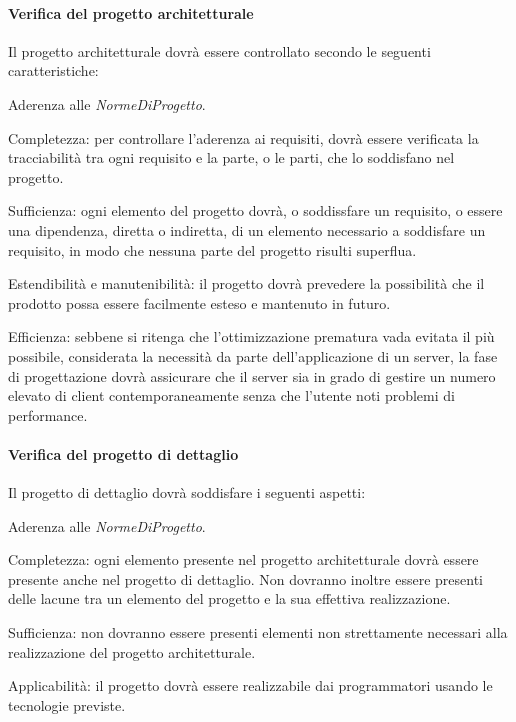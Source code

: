 \paragraph{Verifica del progetto architetturale}
Il progetto architetturale dovr\`a essere controllato secondo le seguenti caratteristiche:
\begin{elenconumerato}[\textbf{}]{\subsubsecindent}
\item Aderenza alle \textit{NormeDiProgetto}.
\item Completezza: per controllare l'aderenza ai requisiti, dovr\`a essere verificata la tracciabilit\`a tra ogni requisito e la parte, o le parti, che lo soddisfano nel progetto.
\item Sufficienza: ogni elemento del progetto dovr\`a, o soddissfare un requisito, o essere una dipendenza, diretta o indiretta, di un elemento necessario a soddisfare un requisito, in modo che nessuna parte del progetto risulti superflua.
\item Estendibilit\`a e manutenibilit\`a: il progetto dovr\`a prevedere la possibilit\`a che il prodotto possa essere facilmente esteso e mantenuto in futuro.
\item Efficienza: sebbene si ritenga che l'ottimizzazione prematura vada evitata il pi\`u possibile, considerata la necessit\`a da parte dell'applicazione di un server, la fase di progettazione dovr\`a assicurare che il server sia in grado di gestire un numero elevato di client contemporaneamente senza che l'utente noti problemi di performance.
\end{elenconumerato}
\paragraph{Verifica del progetto di dettaglio}
Il progetto di dettaglio dovr\`a soddisfare i seguenti aspetti:
\begin{elenconumerato}[\textbf{}]{\subsubsecindent}
\item Aderenza alle \textit{NormeDiProgetto}.
\item Completezza: ogni elemento presente nel progetto architetturale dovr\`a essere presente anche nel progetto di dettaglio. Non dovranno inoltre essere presenti delle lacune tra un elemento del progetto e la sua effettiva realizzazione.
\item Sufficienza: non dovranno essere presenti elementi non strettamente necessari alla realizzazione del progetto architetturale.
\item Applicabilit\`a: il progetto dovr\`a essere realizzabile dai programmatori usando le tecnologie previste.
\end{elenconumerato}
